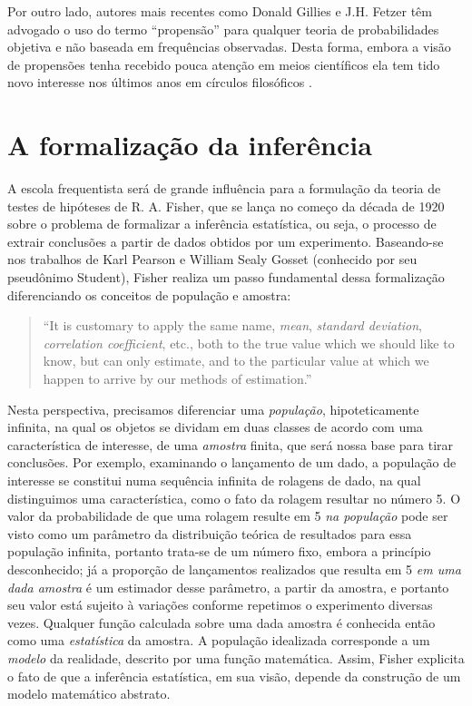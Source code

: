 Por outro lado, autores mais recentes como Donald Gillies e J.H. Fetzer têm advogado o uso do termo ``propensão'' para
qualquer teoria de probabilidades objetiva e não baseada em frequências observadas.
Desta forma, embora a visão de propensões tenha recebido pouca atenção em meios científicos
ela tem tido novo interesse nos últimos anos em círculos filosóficos \citep{Gillies2000}.

\section{A formalização da inferência}%

A escola frequentista será de grande influência para a formulação da teoria de testes de hipóteses de R. A. Fisher, que se
lança no começo da década de 1920 sobre o problema de formalizar a inferência estatística, ou seja, o processo de
extrair conclusões a partir de dados obtidos por um experimento. Baseando-se nos trabalhos de Karl Pearson e William Sealy Gosset
(conhecido por seu pseudônimo Student), Fisher realiza um passo fundamental dessa formalização
diferenciando os conceitos de população e amostra:

\begin{quote}
``It is customary to apply the same name, {\em mean}, {\em standard deviation}, {\em correlation coefficient}, etc., both 
to the true value which we should like to know, but can only estimate, and to the particular value at which we happen 
to arrive by our methods of estimation.''\citep{Fisher1922}
\end{quote}

Nesta perspectiva, precisamos diferenciar uma {\em população}, hipoteticamente infinita, na qual os objetos se dividam em duas
classes de acordo com uma característica de interesse, de uma {\em amostra} finita, que será nossa base para tirar conclusões.
Por exemplo, examinando o lançamento de um dado, a população de interesse se constitui numa sequência infinita de rolagens
de dado, na qual distinguimos uma característica, como o fato da rolagem resultar no número 5. O valor da probabilidade de que
uma rolagem resulte em 5 {\em na população} pode ser visto como um parâmetro da distribuição teórica de resultados para essa
população infinita, portanto trata-se de um número fixo, embora a princípio desconhecido; 
já a proporção de lançamentos realizados que resulta em 5 {\em em uma dada amostra} é um estimador desse parâmetro,
a partir da amostra, e portanto seu valor está sujeito à variações
conforme repetimos o experimento 
diversas vezes.
Qualquer função calculada sobre uma dada amostra é conhecida então como uma {\em estatística} da amostra.
A população idealizada corresponde a um {\em modelo} da realidade, descrito por uma função matemática.
Assim, Fisher explicita o fato de que a inferência estatística, em sua visão, depende da construção de um modelo matemático
abstrato.

